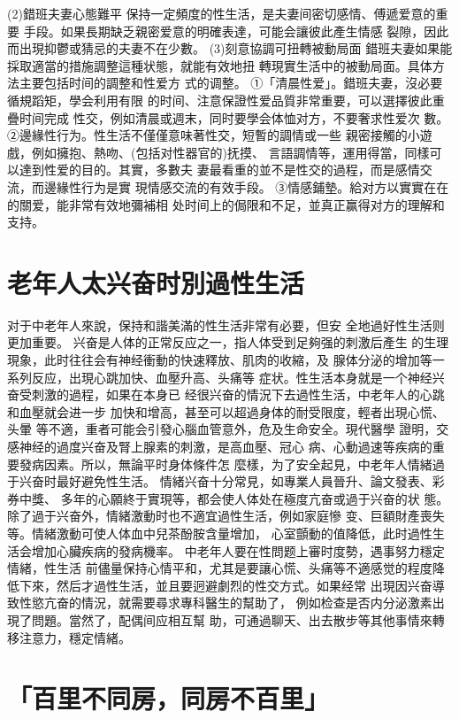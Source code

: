 \documentclass[12pt,UTF8]{ctexbook}
\begin{document}
(2)錯班夫妻心態難平
保持一定頻度的性生活，是夫妻间密切感情、傅遞爱意的重要
手段。如果長期缺乏親密爱意的明確表達，可能会讓彼此產生情感
裂隙，因此而出現抑鬱或猜忌的夫妻不在少數。
(3)刻意協調可扭轉被動局面
錯班夫妻如果能採取適當的措施調整這種状態，就能有效地扭
轉現實生活中的被動局面。具体方法主要包括时间的調整和性爱方
式的调整。
①「清晨性爱」。錯班夫妻，沒必要循規蹈矩，學会利用有限
的时间、注意保證性爱品質非常重要，可以選擇彼此重疊时间完成
性交，例如清晨或週末，同时要學会体恤对方，不要奢求性爱次
數。
②邊緣性行为。性生活不僅僅意味著性交，短暫的調情或一些
親密接觸的小遊戲，例如擁抱、熱吻、(包括对性器官的)抚摸、
言語調情等，運用得當，同樣可以達到性爱的目的。其實，多數夫
妻最看重的並不是性交的過程，而是感情交流，而邊緣性行为是實
現情感交流的有效手段。
③情感鋪墊。給对方以實實在在的關爱，能非常有效地彌補相
处时间上的侷限和不足，並真正赢得对方的理解和支持。


\section{老年人太兴奋时別過性生活}

对于中老年人來說，保持和諧美滿的性生活非常有必要，但安
全地過好性生活则更加重要。
兴奋是人体的正常反应之一，指人体受到足夠强的刺激后產生
的生理現象，此时往往会有神经衝動的快速釋放、肌肉的收縮，及
腺体分泌的增加等一系列反应，出現心跳加快、血壓升高、头痛等
症状。性生活本身就是一个神经兴奋受刺激的過程，如果在本身已
经很兴奋的情況下去過性生活，中老年人的心跳和血壓就会进一步
加快和增高，甚至可以超過身体的耐受限度，輕者出現心慌、头暈
等不適，重者可能会引發心腦血管意外，危及生命安全。現代醫學
證明，交感神经的過度兴奋及腎上腺素的刺激，是高血壓、冠心
病、心動過速等疾病的重要發病因素。所以，無論平时身体條件怎
麼樣，为了安全起見，中老年人情緒過于兴奋时最好避免性生活。
情緒兴奋十分常見，如專業人員晉升、論文發表、彩券中獎、
多年的心願終于實現等，都会使人体处在極度亢奋或過于兴奋的状
態。除了過于兴奋外，情緒激動时也不適宜過性生活，例如家庭慘
变、巨額財產喪失等。情緒激動可使人体血中兒茶酚胺含量增加，
心室顫動的值降低，此时過性生活会增加心臟疾病的發病機率。
中老年人要在性問题上審时度勢，遇事努力穩定情緒，性生活
前儘量保持心情平和，尤其是要讓心慌、头痛等不適感觉的程度降
低下來，然后才過性生活，並且要迥避劇烈的性交方式。如果经常
出現因兴奋導致性慾亢奋的情況，就需要尋求專科醫生的幫助了，
例如检查是否内分泌激素出現了問題。當然了，配偶间应相互幫
助，可通過聊天、出去散步等其他事情來轉移注意力，穩定情緒。

\section{「百里不同房，同房不百里」}
\end{document}
